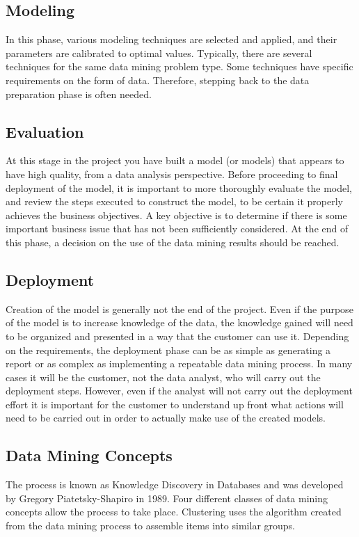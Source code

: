 \subsection{Modeling}

In this phase, various modeling techniques are selected and applied, and their parameters are calibrated to optimal values. Typically, there are several techniques for the same data mining problem type. Some techniques have specific requirements on the form of data. Therefore, stepping back to the data preparation phase is often needed.

\subsection{Evaluation}

At this stage in the project you have built a model (or models) that appears to have high quality, from a data analysis perspective. Before proceeding to final deployment of the model, it is important to more thoroughly evaluate the model, and review the steps executed to construct the model, to be certain it properly achieves the business objectives. A key objective is to determine if there is some important business issue that has not been sufficiently considered. At the end of this phase, a decision on the use of the data mining results should be reached.

\subsection{Deployment}

Creation of the model is generally not the end of the project. Even if the purpose of the model is to increase knowledge of the data, the knowledge gained will need to be organized and presented in a way that the customer can use it. Depending on the requirements, the deployment phase can be as simple as generating a report or as complex as implementing a repeatable data mining process. In many cases it will be the customer, not the data analyst, who will carry out the deployment steps. However, even if the analyst will not carry out the deployment effort it is important for the customer to understand up front what actions will need to be carried out in order to actually make use of the created models.



\subsection{Data Mining Concepts}

The process is known as Knowledge Discovery in Databases and was developed by Gregory Piatetsky-Shapiro in 1989. Four different classes of data mining concepts allow the process to take place. Clustering uses the algorithm created from the data mining process to assemble items into similar groups.
